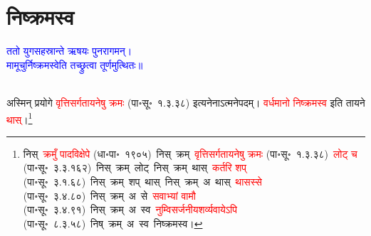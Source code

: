 \section[निष्क्रमस्व]{निष्क्रमस्व}
\centering\textcolor{blue}{ततो युगसहस्रान्ते ऋषयः पुनरागमन्।\nopagebreak\\
मामूचुर्निष्क्रमस्वेति तच्छ्रुत्वा तूर्णमुत्थितः॥}\nopagebreak\\
\\
\fontsize{14}{21}\selectfont\begin{sloppypar}\justifying\noindent\hspace{10mm} अस्मिन् प्रयोगे \textcolor{red}{वृत्ति\-सर्ग\-तायनेषु क्रमः} (पा॰सू॰~१.३.३८) इत्यनेनाऽत्मनेपदम्। \textcolor{red}{वर्धमानो निष्क्रमस्व} इति तायने \textcolor{red}{थास्}।\footnote{निस्~\textcolor{red}{क्रमुँ पादविक्षेपे} (धा॰पा॰~१९०५)~\arrow निस्~क्रम्~\arrow \textcolor{red}{वृत्ति\-सर्ग\-तायनेषु क्रमः} (पा॰सू॰~१.३.३८)~\arrow \textcolor{red}{लोट् च} (पा॰सू॰~३.३.१६२)~\arrow निस्~क्रम्~लोट्~\arrow निस्~क्रम्~थास्~\arrow \textcolor{red}{कर्तरि शप्‌} (पा॰सू॰~३.१.६८)~\arrow निस्~क्रम्~शप्~थास्~\arrow निस्~क्रम्~अ~थास्~\arrow \textcolor{red}{थासस्से} (पा॰सू॰~३.४.८०)~\arrow निस्~क्रम्~अ~से~\arrow \textcolor{red}{सवाभ्यां वामौ} (पा॰सू॰~३.४.९१)~\arrow निस्~क्रम्~अ~स्व~\arrow \textcolor{red}{नुम्विसर्जनीय\-शर्व्यवायेऽपि} (पा॰सू॰~८.३.५८)~\arrow निष्~क्रम्~अ~स्व~\arrow निष्क्रमस्व।}\end{sloppypar}
